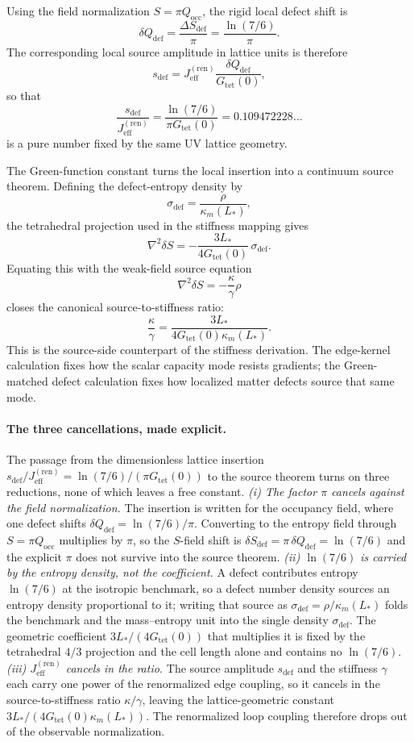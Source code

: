 \documentclass[11pt]{article}
\begin{document}
Using the field normalization $S=\pi Q_{\mathrm{occ}}$, the rigid local defect shift is
\[
\delta Q_{\mathrm{def}}=\frac{\Delta S_{\mathrm{def}}}{\pi}
=
\frac{\ln(7/6)}{\pi}.
\]
The corresponding local source amplitude in lattice units is therefore
\[
s_{\mathrm{def}}
=
J_{\mathrm{eff}}^{(\mathrm{ren})}
\frac{\delta Q_{\mathrm{def}}}{G_{\mathrm{tet}}(0)},
\]
so that
\[
\frac{s_{\mathrm{def}}}{J_{\mathrm{eff}}^{(\mathrm{ren})}}
=
\frac{\ln(7/6)}{\pi G_{\mathrm{tet}}(0)}
=
0.109472228\ldots
\]
is a pure number fixed by the same UV lattice geometry.

The Green-function constant turns the local insertion into a continuum source theorem. Defining the defect-entropy density by
\[
\sigma_{\mathrm{def}}=\frac{\rho}{\kappa_m(L_*)},
\]
the tetrahedral projection used in the stiffness mapping gives
\[
\nabla^2\delta S
=
-\frac{3L_*}{4G_{\mathrm{tet}}(0)}\,\sigma_{\mathrm{def}}.
\]
Equating this with the weak-field source equation
\[
\nabla^2\delta S=-\frac{\kappa}{\gamma}\rho
\]
closes the canonical source-to-stiffness ratio:
\[
\boxed{
\frac{\kappa}{\gamma}
=
\frac{3L_*}{4G_{\mathrm{tet}}(0)\kappa_m(L_*)}
}.
\]
This is the source-side counterpart of the stiffness derivation. The edge-kernel calculation fixes how the scalar capacity mode resists gradients; the Green-matched defect calculation fixes how localized matter defects source that same mode.

\paragraph{The three cancellations, made explicit.}
The passage from the dimensionless lattice insertion $s_{\mathrm{def}}/J_{\mathrm{eff}}^{(\mathrm{ren})}=\ln(7/6)/(\pi G_{\mathrm{tet}}(0))$ to the source theorem turns on three reductions, none of which leaves a free constant.
\emph{(i) The factor $\pi$ cancels against the field normalization.} The insertion is written for the occupancy field, where one defect shifts $\delta Q_{\mathrm{def}}=\ln(7/6)/\pi$. Converting to the entropy field through $S=\pi Q_{\mathrm{occ}}$ multiplies by $\pi$, so the $S$-field shift is $\delta S_{\mathrm{def}}=\pi\,\delta Q_{\mathrm{def}}=\ln(7/6)$ and the explicit $\pi$ does not survive into the source theorem.
\emph{(ii) $\ln(7/6)$ is carried by the entropy density, not the coefficient.} A defect contributes entropy $\ln(7/6)$ at the isotropic benchmark, so a defect number density sources an entropy density proportional to it; writing that source as $\sigma_{\mathrm{def}}=\rho/\kappa_m(L_*)$ folds the benchmark and the mass--entropy unit into the single density $\sigma_{\mathrm{def}}$. The geometric coefficient $3L_*/(4G_{\mathrm{tet}}(0))$ that multiplies it is fixed by the tetrahedral $4/3$ projection and the cell length alone and contains no $\ln(7/6)$.
\emph{(iii) $J_{\mathrm{eff}}^{(\mathrm{ren})}$ cancels in the ratio.} The source amplitude $s_{\mathrm{def}}$ and the stiffness $\gamma$ each carry one power of the renormalized edge coupling, so it cancels in the source-to-stiffness ratio $\kappa/\gamma$, leaving the lattice-geometric constant $3L_*/(4G_{\mathrm{tet}}(0)\kappa_m(L_*))$. The renormalized loop coupling therefore drops out of the observable normalization.
\end{document}
